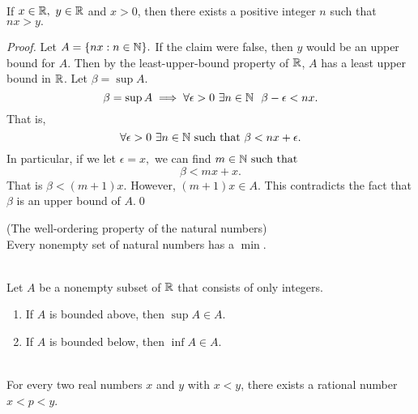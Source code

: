 \begin{theorem}  \leavevmode \\
    If $x\in \mathbb{R}, ~y\in \mathbb{R}$ and $x > 0$, then there exists a positive integer $n$ such that $nx > y.$
\end{theorem}

\begin{proof}
    Let $A=\{nx : n \in \mathbb{N}\}.$ If the claim were false, then $y$ would be an upper bound for $A$. Then by the least-upper-bound property of $\R$, $A$ has a least upper bound in $\R$. Let $\beta = \sup A$.
    $$\beta = \sup A \implies \forall \epsilon > 0 ~\exists n \in \mathbb{N} ~~\beta - \epsilon < nx.$$
    That is,
    $$\forall \epsilon > 0 ~\exists n \in \mathbb{N} \text{ such that } \beta < nx + \epsilon.$$
    In particular, if we let $\epsilon = x,$ we can find $m \in \mathbb{N} \text{ such that }$
    $$\beta < mx + x.$$
    That is $\beta < (m+1)x.$ However, $(m+1)x \in A.$ This contradicts the fact that $\beta$ is an upper bound of $A$.\qed
\end{proof}

\begin{remark} \leavevmode
    (The well-ordering property of the natural numbers) \\
    Every nonempty set of natural numbers has a $\min.$
\end{remark}

\begin{corollary} \leavevmode \\
    Let $A$ be a nonempty subset of $\R$ that consists of only integers.
    \begin{enumerate}[$*)$]
        \item If $A$ is bounded above, then $\sup A \in A.$
        \item If $A$ is bounded below, then $\inf A \in A.$
    \end{enumerate}
\end{corollary}

\begin{theorem}[Density of $\Q$ in $\R$] \leavevmode \\
    For every two real numbers $x$ and $y$ with $x < y$, there exists a rational number $x < p < y$.
\end{theorem}

